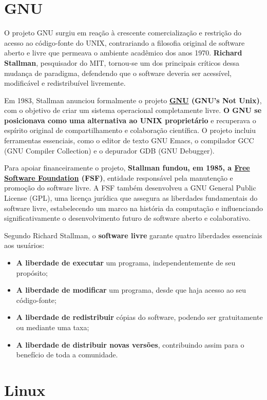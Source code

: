 \documentclass[12pt,oneside,a4paper]{abntex2}
\begin{document}
\section{GNU}

O projeto GNU surgiu em reação à crescente comercialização e restrição do acesso ao código-fonte do UNIX, contrariando a filosofia original de software aberto e livre que permeava o ambiente acadêmico dos anos 1970. \textbf{Richard Stallman}, pesquisador do MIT, tornou-se um dos principais críticos dessa mudança de paradigma, defendendo que o software deveria ser acessível, modificável e redistribuível livremente.

Em 1983, Stallman anunciou formalmente o projeto \textbf{\href{https://www.gnu.org/gnu/gnu-history.html}{GNU} (GNU's Not Unix)}, com o objetivo de criar um sistema operacional completamente livre. \textbf{O GNU se posicionava como uma alternativa ao UNIX proprietário} e recuperava o espírito original de compartilhamento e colaboração científica. O projeto incluiu ferramentas essenciais, como o editor de texto GNU Emacs, o compilador GCC (GNU Compiler Collection) e o depurador GDB (GNU Debugger).

Para apoiar financeiramente o projeto, \textbf{Stallman fundou, em 1985, a \href{https://www.fsf.org/about/}{Free Software Foundation} (FSF)}, entidade responsável pela manutenção e promoção do software livre. A FSF também desenvolveu a GNU General Public License (GPL), uma licença jurídica que assegura as liberdades fundamentais do software livre, estabelecendo um marco na história da computação e influenciando significativamente o desenvolvimento futuro de software aberto e colaborativo.

Segundo Richard Stallman, o \textbf{software livre} garante quatro liberdades essenciais aos usuários:
\begin{itemize}
    \item \textbf{A liberdade de executar} um programa, independentemente de seu propósito;
    \item \textbf{A liberdade de modificar} um programa, desde que haja acesso ao seu código-fonte;
    \item \textbf{A liberdade de redistribuir} cópias do software, podendo ser gratuitamente ou mediante uma taxa;
    \item \textbf{A liberdade de distribuir novas versões}, contribuindo assim para o benefício de toda a comunidade.
\end{itemize}

\section{Linux}
\end{document}
